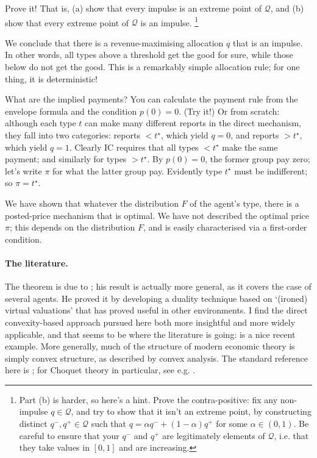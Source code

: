 \begin{exercise}
	\label{exercise:incr_ext_pnts}
	Prove it! That is,
	(a) show that every impulse is an extreme point of $\mathcal{Q}$, and
	(b) show that every extreme point of $\mathcal{Q}$ is an impulse.%
		\footnote{Part (b) is harder, so here's a hint.
		Prove the contra-positive: fix any non-impulse $q \in \mathcal{Q}$, and try to show that it isn't an extreme point, by constructing distinct $q^-,q^+ \in \mathcal{Q}$ such that $q = \alpha q^- + (1-\alpha) q^+$ for some $\alpha \in (0,1)$.
		Be careful to ensure that your $q^-$ and $q^+$ are legitimately elements of $\mathcal{Q}$, i.e. that they take values in $[0,1]$ and are increasing.}
\end{exercise}


We conclude that there is a revenue-maximising allocation $q$
that is an impulse.
In other words, all types above a threshold get the good for sure,
while those below do not get the good.
This is a remarkably simple allocation rule; for one thing, it is deterministic!

What are the implied payments? You can calculate the payment rule from the envelope formula and the condition $p(0)=0$. (Try it!)
Or from scratch: although each type $t$ can make many different reports in the direct mechanism, they fall into two categories: reports $< t^\star$, which yield $q=0$,
and reports $>t^\star$, which yield $q=1$.
Clearly IC requires that all types $<t^\star$ make the same payment;
and similarly for types $>t^\star$.
By $p(0)=0$, the former group pay zero;
let's write $\pi$ for what the latter group pay.
Evidently type $t^\star$ must be indifferent; so $\pi = t^\star$.

We have shown that whatever the distribution $F$ of the agent's type,
there is a posted-price mechanism that is optimal.
We have not described the optimal price $\pi$; this depends on the distribution $F$, and is easily characterised via a first-order condition.


\paragraph{The literature.}
The theorem is due to \textcite{Myerson1981}; his result is actually more general, as it covers the case of several agents.
He proved it by developing a duality technique based on `(ironed) virtual valuations' that has proved useful in other environments.
I find the direct convexity-based approach pursued here both more insightful and more widely applicable,
and that seems to be where the literature is going: \textcite{KleinerMoldovanuStrack2021} is a nice recent example.
More generally, much of the structure of modern economic theory is simply convex structure, as described by convex analysis. The standard reference here is \textcite{Rockafellar1970}; for Choquet theory in particular, see e.g. \textcite{Phelps2001}.


